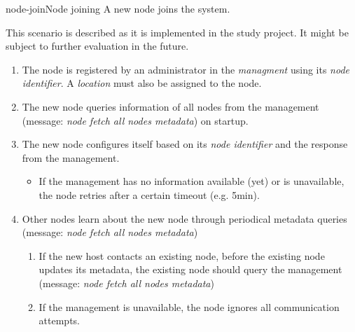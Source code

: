\begin{scenario}{node-join}{Node joining}
    A new node joins the system.
    
	This scenario is described as it is implemented in the study project. It might be subject to further evaluation in the future.

    \begin{enumerate}
    	\item The node is registered by an administrator in the \emph{managment} using its \emph{node identifier}. A \emph{location} must also be assigned to the node. %
    	\item The new node queries information of all nodes from the management (message: \emph{node fetch all nodes metadata}) on startup. 
    	\item The new node configures itself based on its \emph{node identifier} and the response from the management.
    		\begin{itemize}
    			\item If the management has no information available (yet) or is unavailable, the node retries after a certain timeout (e.g. 5min).
    		\end{itemize}
    	\item
    	Other nodes learn about the new node through periodical metadata queries (message: \emph{node fetch all nodes metadata}) %
    		\begin{enumerate}
    			\item If the new host contacts an existing node, before the existing node updates its metadata, the existing node should query the management (message: \emph{node fetch all nodes metadata})
    			\item If the management is unavailable, the node ignores all communication attempts.
    		\end{enumerate}
    \end{enumerate}
\end{scenario}


